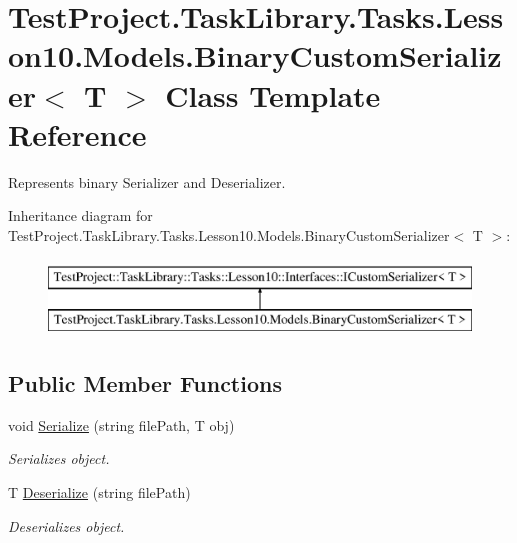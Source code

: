 \hypertarget{class_test_project_1_1_task_library_1_1_tasks_1_1_lesson10_1_1_models_1_1_binary_custom_serializer}{}\section{Test\+Project.\+Task\+Library.\+Tasks.\+Lesson10.\+Models.\+Binary\+Custom\+Serializer$<$ T $>$ Class Template Reference}
\label{class_test_project_1_1_task_library_1_1_tasks_1_1_lesson10_1_1_models_1_1_binary_custom_serializer}


Represents binary Serializer and Deserializer.  


Inheritance diagram for Test\+Project.\+Task\+Library.\+Tasks.\+Lesson10.\+Models.\+Binary\+Custom\+Serializer$<$ T $>$\+:\begin{figure}[H]
\begin{center}
\leavevmode
\includegraphics[height=2.000000cm]{class_test_project_1_1_task_library_1_1_tasks_1_1_lesson10_1_1_models_1_1_binary_custom_serializer}
\end{center}
\end{figure}
\subsection*{Public Member Functions}
\begin{DoxyCompactItemize}
\item 
void \mbox{\hyperlink{class_test_project_1_1_task_library_1_1_tasks_1_1_lesson10_1_1_models_1_1_binary_custom_serializer_a2ba6d10308232409fb1e0c0ee804c227}{Serialize}} (string file\+Path, T obj)
\begin{DoxyCompactList}\small\item\em Serializes object. \end{DoxyCompactList}\item 
T \mbox{\hyperlink{class_test_project_1_1_task_library_1_1_tasks_1_1_lesson10_1_1_models_1_1_binary_custom_serializer_aa90860932ba8619bacf607b4be2c4b6e}{Deserialize}} (string file\+Path)
\begin{DoxyCompactList}\small\item\em Deserializes object. \end{DoxyCompactList}\end{DoxyCompactItemize}


